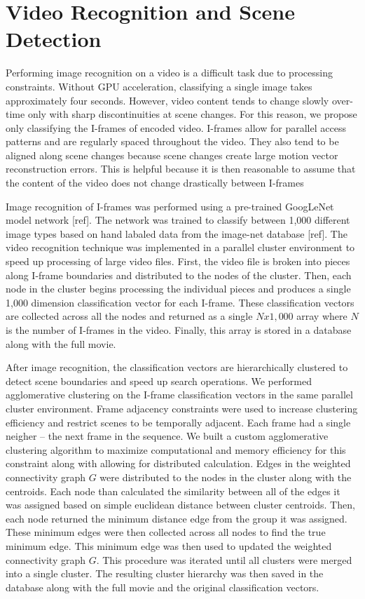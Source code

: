 \documentclass{article}
\begin{document}
\section{Video Recognition and Scene Detection}

Performing image recognition on a video is a difficult task due to processing constraints.
Without GPU acceleration, classifying a single image takes approximately four seconds.
However, video content tends to change slowly over-time only with sharp discontinuities at scene changes.
For this reason, we propose only classifying the I-frames of encoded video.
I-frames allow for parallel access patterns and are regularly spaced throughout the video.
They also tend to be aligned along scene changes because scene changes create large motion vector reconstruction errors.
This is helpful because it is then reasonable to assume that the content of the video does not change drastically between I-frames

Image recognition of I-frames was performed using a pre-trained GoogLeNet model network [ref]. 
The network was trained to classify between 1,000 different image types based on hand labaled data from the image-net database [ref].
The video recognition technique was implemented in a parallel cluster environment to speed up processing of large video files.
First, the video file is broken into pieces along I-frame boundaries and distributed to the nodes of the cluster.
Then, each node in the cluster begins processing the individual pieces and produces a single 1,000 dimension classification vector for each I-frame.
These classification vectors are collected across all the nodes and returned as a single $Nx1,000$ array where $N$ is the number of I-frames in the video.
Finally, this array is stored in a database along with the full movie.

After image recognition, the classification vectors are hierarchically clustered to detect scene boundaries and speed up search operations.
We performed agglomerative clustering on the I-frame classification vectors in the same parallel cluster environment.
Frame adjacency constraints were used to increase clustering efficiency and restrict scenes to be temporally adjacent.
Each frame had a single neigher -- the next frame in the sequence.
We built a custom agglomerative clustering algorithm to maximize computational and memory efficiency for this constraint along with allowing for distributed calculation.
Edges in the weighted connectivity graph $G$ were distributed to the nodes in the cluster along with the centroids.
Each node than calculated the similarity between all of the edges it was assigned based on simple euclidean distance between cluster centroids.
Then, each node returned the minimum distance edge from the group it was assigned.
These minimum edges were then collected across all nodes to find the true minimum edge.
This minimum edge was then used to updated the weighted connectivity graph $G$.
This procedure was iterated until all clusters were merged into a single cluster.
The resulting cluster hierarchy was then saved in the database along with the full movie and the original classification vectors.
\end{document}
